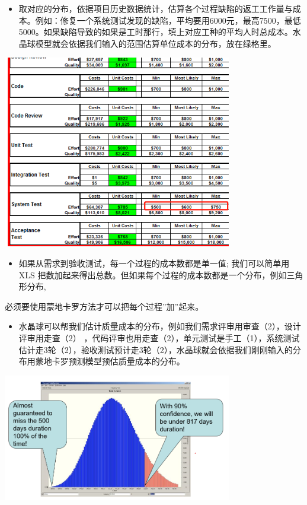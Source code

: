 \begin{itemize}
\tightlist
\item
  取对应的分布，依据项目历史数据统计，估算各个过程缺陷的返工工作量与成本。例如：修复一个系统测试发现的缺陷，平均要用6000元，最高7500，最低5000。如果缺陷导致的如果是工时那行，填上对应工种的平均人时总成本。水晶球模型就会依据我们输入的范围估算单位成本的分布，放在绿格里。
\end{itemize}


\includegraphics[width=10cm]{微信截图_20211027012006.png}

\begin{itemize}
\tightlist
\item
  如果从需求到验收测试，每一个过程的成本数都是单一值; 我们可以简单用 XLS
  把数加起来得出总数。但如果每个过程的成本数都是一个分布，例如三角形分布,
\end{itemize}

必须要使用蒙地卡罗方法才可以把每个过程''加''起来。

\begin{itemize}
\tightlist
\item
  水晶球可以帮我们估计质量成本的分布，例如我们需求评审用审查（2），设计评审用走查（2）
  ，代码评审也用走查（2），单元测试是手工（1），系统测试估计走3轮（2），验收测试预计走3轮（2），水晶球就会依据我们刚刚输入的分布用蒙地卡罗预测模型预估质量成本的分布。
\end{itemize}


\includegraphics[width=10cm]{HmttDistScreenshot_2021-10-08_165836.png}


